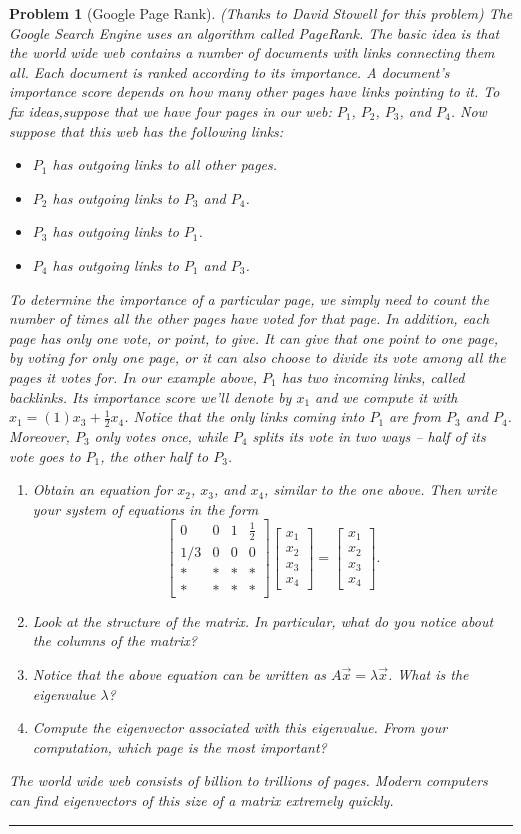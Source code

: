 \documentclass[letterpaper,oneside]{book}%
\theoremstyle{plain}
\theoremstyle{box}
\theoremstyle{problem}
\newtheorem{problemnum}{Problem}[chapter]
\newenvironment{problem}[1][]{\begin{problemnum}[#1]}{\end{problemnum}\nopagebreak\hrule\bigskip}
\newcommand{\bvec}[1]{\begin{bmatrix} #1 \end{bmatrix}}
\begin{document}
\begin{problem}[Google Page Rank](Thanks to David Stowell for this problem) 
The Google Search Engine uses an algorithm called PageRank.
The basic idea is that the world wide web contains a number of documents with links connecting them all.  
Each document is ranked according to its importance.
A document's importance score depends on how many other pages have links pointing to it.
To fix ideas,suppose that we have four pages in our web: $P_1$, $P_2$, $P_3$, and $P_4$. 
Now suppose that this web has the following links:\
\begin{itemize}
 \item $P_1$ has outgoing links to all other pages.
 \item $P_2$ has outgoing links to $P_3$ and $P_4$.
 \item $P_3$ has outgoing links to $P_1$.
 \item $P_4$ has outgoing links to $P_1$ and $P_3$.
\end{itemize}
To determine the importance of a particular page, we simply need to count the number of times all the other pages have voted for that page.  In addition, each page has only one vote, or point, to give. It can give that one point to one page, by voting for only one page, or it can also choose to divide its vote among all the pages it votes for. In our example above, $P_1$ has two incoming links, called backlinks.
Its importance score we'll denote by $x_1$ and we compute it with $x_1 = (1){x_3}+\frac{1}{2}x_4$. Notice that the only links coming into $P_1$ are from $P_3$ and $P_4$. Moreover, $P_3$ only votes once, while $P_4$ splits its vote in two ways -- half of its vote goes to $P_1$, the other half to $P_3$. 
\begin{enumerate}
 \item Obtain an equation for $x_2$, $x_3$, and $x_4$, similar to the one above.  Then write your system of equations in the form 
$$
\bvec{
0&0&1&\frac{1}{2}\\
1/3&0&0&0\\
*&*&*&*\\
*&*&*&*
}
\bvec{x_1\\x_2\\x_3\\x_4}=\bvec{x_1\\x_2\\x_3\\x_4}.
$$
\item Look at the structure of the matrix.  In particular, what do you notice about the columns of the matrix?
\item Notice that the above equation can be written as $A\vec x = \lambda \vec x$. What is the eigenvalue $\lambda$?
\item Compute the eigenvector associated with this eigenvalue.  From your computation, which page is the most important?
\end{enumerate}
The world wide web consists of billion to trillions of pages. Modern computers can find eigenvectors of this size of a matrix extremely quickly.  
\end{problem}
\end{document}
